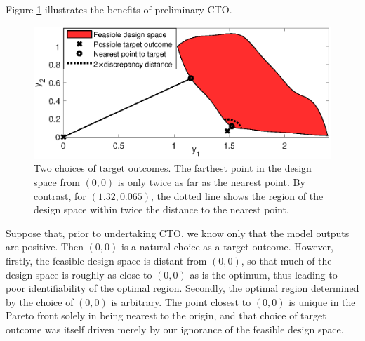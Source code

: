 \documentclass[12pt]{article}
\begin{document}
Figure \ref{fig:do_selection_example} illustrates the benefits of preliminary CTO.
%
\begin{figure}
\centering
\includegraphics[scale=.8]{FIG_des_obs_selection_example.eps}
\caption{Two choices of target outcomes.
%
The farthest point in the design space from $(0,0)$ is only twice as far as  the nearest point.
%
By contrast, for $(1.32,0.065)$, the dotted line shows the region of the design space within twice the distance to the nearest point.}
\label{fig:do_selection_example}
\end{figure}
%
Suppose that, prior to undertaking CTO, we know only that the model outputs are positive.
%
Then $(0,0)$ is a natural choice as a target outcome.
%
%
However, firstly, the feasible design space is distant from $(0,0)$, so that much of the design space is roughly as close to $(0,0)$ as is the optimum, thus leading to poor identifiability of the optimal region.
%
%
%
%
Secondly, the optimal region determined by the choice of $(0,0)$ is arbitrary.
%
%
The point closest to $(0,0)$ is
%
unique in the Pareto front solely in being nearest to the origin, and that choice of target outcome was itself driven merely by our ignorance of the feasible design space.
\end{document}
